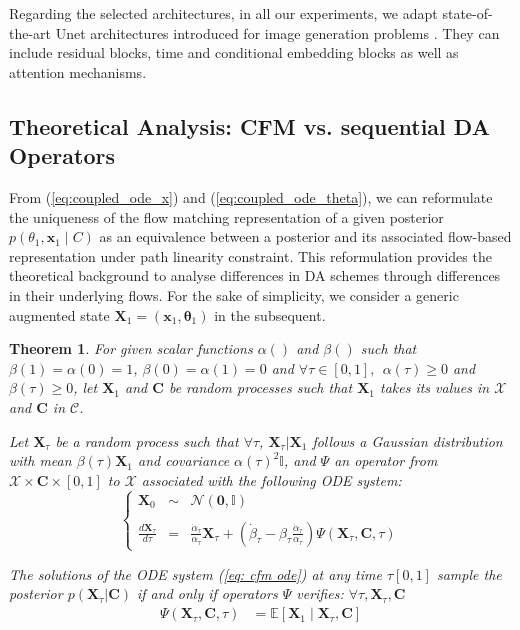 \documentclass[10pt]{article}
\newtheorem{theorem}{Theorem}
\begin{document}
Regarding the selected architectures, in all our experiments, we adapt state-of-the-art Unet architectures introduced for image generation problems \cite{}. They can include residual blocks, time  and conditional embedding blocks as well as attention mechanisms.

\subsection{Theoretical Analysis: CFM vs. sequential DA Operators}
\label{sec: theory DA-CFM}

From (\ref{eq:coupled_ode_x}) and (\ref{eq:coupled_ode_theta}), we can reformulate the uniqueness of the flow matching representation of a given posterior $p(\theta_1,\mathbf{x}_1\mid C)$ as an equivalence between a posterior and its associated flow-based representation under path linearity constraint. This reformulation provides the theoretical background to analyse differences in DA schemes through differences in their underlying flows. For the sake of simplicity, we consider a generic augmented state $\mathbf{X}_1=(\mathbf{x}_1,\mathbf{\theta}_1)$ in the subsequent.

\begin{theorem}
For given scalar functions $\alpha()$ and $\beta()$ such that $\beta(1)=\alpha(0)=1$, $\beta(0)=\alpha(1)=0$ and $\forall \tau \in[0,1], \ \ \alpha(\tau) \geq 0$ and $\beta(\tau) \geq 0$, let $\mathbf{X}_1$ and $\mathbf{C}$ be random processes such that $\mathbf{X}_1$ takes its values in $\mathcal{X}$ and $\mathbf{C}$ in $\mathcal{C}$. 

Let $\mathbf{X}_\tau$ be a random process  such that $\forall \tau$,  $\mathbf{X}_\tau |\mathbf{X}_1$ follows a Gaussian distribution with mean $\beta(\tau) \mathbf{X}_1$ and covariance 
$\alpha(\tau)^2\mathbb{I}$, and $\Psi$ an operator from $\mathcal{X} \times \mathbf{C}\times[0,1]$ to $\mathcal{X}$ associated with the following ODE system:
\begin{equation}
    \label{eq: cfm ode}
    \left \{\begin{array}{ccl}
    \displaystyle \mathbf{X}_0 &\sim& \displaystyle \mathcal{N}\left( \mathbf{0},\mathbb{I}\right )\\~\\
    \displaystyle \frac{d\mathbf{X}_\tau}{d\tau} &=& \displaystyle \frac{\dot{\alpha}_\tau}{\alpha_\tau} \mathbf{X}_\tau + \left( \dot{\beta}_\tau - \beta_\tau \frac{\dot{\alpha}_\tau}{\alpha_\tau} \right) \Psi \left( \mathbf{X}_\tau, \mathbf{C},\tau \right )   \end{array}\right.
\end{equation}




The solutions of the ODE system (\ref{eq: cfm ode}) at any time $\tau [0,1]$ sample the posterior $p(\mathbf{X}_\tau | \mathbf{C})$ if and only if operators $\Psi$ verifies: $\forall \tau, \mathbf{X}_\tau, \mathbf{C}$
\begin{align}
  \Psi \left( \mathbf{X}_\tau, \mathbf{C},\tau\right ) &= \mathbb{E}\left [\mathbf{X}_1 \mid \mathbf{X}_\tau,\mathbf{C}\right ]
\end{align}
\end{theorem}
\end{document}
